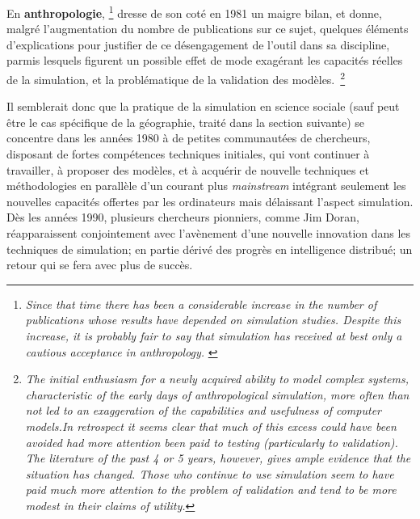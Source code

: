 En \textbf{anthropologie}, \autocite{Dyke1981} \footnote{ \textit{Since that time there has been a considerable increase in the number of publications whose results have depended on simulation studies. Despite this increase, it is probably fair to say that simulation has received at best only a cautious acceptance in anthropology.} \autocite{Dyke1981} } dresse de son coté en 1981 un maigre bilan, et donne, malgré l'augmentation du nombre de publications sur ce sujet, quelques éléments d'explications pour justifier de ce désengagement de l'outil dans sa discipline, parmis lesquels figurent un possible effet de mode exagérant les capacités réelles de la simulation, et la problématique de la validation des modèles. \footnote{\textit{The initial enthusiasm for a newly acquired ability to model complex systems, characteristic of the early days of anthropological simulation, more often than not led to an exaggeration of the capabilities and usefulness of computer models.In retrospect it seems clear that much of this excess could have been avoided had more attention been paid to testing (particularly to validation). The literature of the past 4 or 5 years, however, gives ample evidence that the situation has changed. Those who continue to use simulation seem to have paid much more attention to the problem of validation and tend to be more modest in their claims of utility.}}

Il semblerait donc que la pratique de la simulation en science sociale (sauf peut être le cas spécifique de la géographie, traité dans la section suivante) se concentre dans les années 1980 à de petites communautées de chercheurs, disposant de fortes compétences techniques initiales, qui vont continuer à travailler, à proposer des modèles, et à acquérir de nouvelle techniques et méthodologies en parallèle d'un courant plus \textit{mainstream} intégrant seulement les nouvelles capacités offertes par les ordinateurs mais délaissant l'aspect simulation. 
Dès les années 1990, plusieurs chercheurs pionniers, comme Jim Doran, réapparaissent conjointement avec l’avènement d'une nouvelle innovation dans les techniques de simulation; en partie dérivé des progrès en intelligence distribué; un retour qui se fera avec plus de succès.

